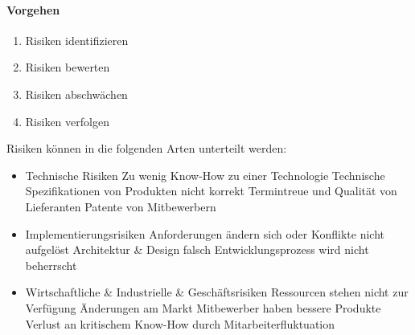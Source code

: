 \paragraph{Vorgehen}
\begin{enumerate}
	\item Risiken identifizieren
	\item Risiken bewerten
	\item Risiken abschwächen
	\item Risiken verfolgen 
\end{enumerate}
Risiken können in die folgenden Arten unterteilt werden:
\begin{itemize}
	\item Technische Risiken
		\subitem Zu wenig Know-How zu einer Technologie
		\subitem Technische Spezifikationen von Produkten nicht korrekt
		\subitem Termintreue und Qualität von Lieferanten
		\subitem Patente von Mitbewerbern
	\item Implementierungsrisiken
		\subitem Anforderungen ändern sich oder Konflikte nicht aufgelöst
		\subitem Architektur \& Design falsch
		\subitem Entwicklungsprozess wird nicht beherrscht
	\item Wirtschaftliche \& Industrielle \& Geschäftsrisiken
		\subitem Ressourcen stehen nicht zur Verfügung
		\subitem Änderungen am Markt
		\subitem Mitbewerber haben bessere Produkte
		\subitem Verlust an kritischem Know-How durch Mitarbeiterfluktuation
\end{itemize}

